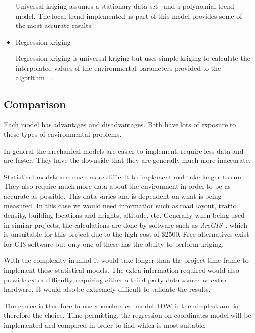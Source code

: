 \begin{itemize}
		Universal kriging assumes a stationary data set~\cite{universalkriging} and a polynomial trend model. The local trend implemented as part of this model provides some of the most accurate results

	\item Regression kriging

		Regression kriging is universal kriging but uses simple kriging to calculate the interpolated values of the environmental parameters provided to the algorithm ~\cite{regressionkriging}. 

\end{itemize}



\subsection{Comparison}\label{interpolationcomparison}

Each model has advantages and disadvantages. Both have lots of exposure to these types of environmental problems. 

In general the mechanical models are easier to implement, require less data and are faster. They have the downside that they are generally much more inaccurate. 

Statistical models are much more difficult to implement and take longer to run. They also require much more data about the environment in order to be as accurate as possible. This data varies and is dependent on what is being measured. In this case we would need information such as road layout, traffic density, building locations and heights, altitude, etc. Generally when being used in similar projects, the calculations are done by software such as \emph{ArcGIS}~\cite{arcgis}, which is unsuitable for this project due to the high cost of \$2500. Free alternatives exist for GIS software but only one of these has the ability to perform kriging. 

With the complexity in mind it would take longer than the project time frame to implement these statistical models. The extra information required would also provide extra difficulty, requiring either a third party data source or extra hardware. It would also be extremely difficult to validate the results. 

The choice is therefore to use a mechanical model. IDW is the simplest and is therefore the choice. Time permitting, the regression on coordinates model will be implemented and compared in order to find which is most suitable. 





